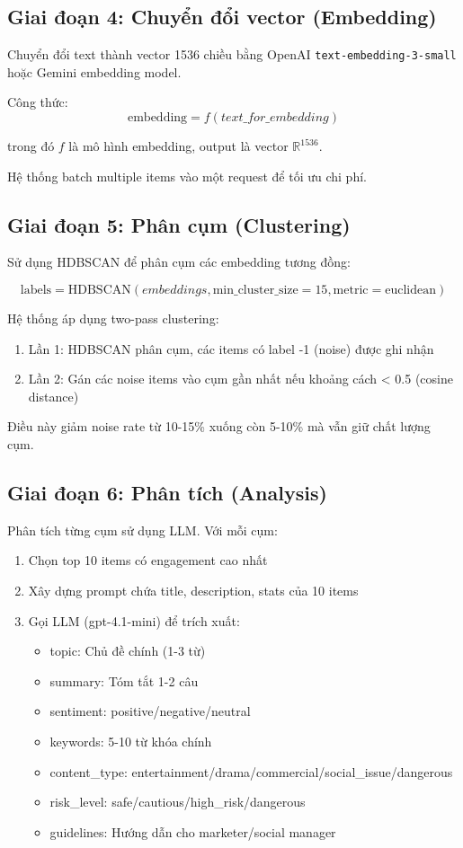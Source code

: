 \subsection{Giai đoạn 4: Chuyển đổi vector (Embedding)}

Chuyển đổi text thành vector 1536 chiều bằng OpenAI \texttt{text-embedding-3-small} hoặc Gemini embedding model.

Công thức:
\[
    \text{embedding} = f(text\_for\_embedding)
\]

trong đó \(f\) là mô hình embedding, output là vector \(\mathbb{R}^{1536}\).

Hệ thống batch multiple items vào một request để tối ưu chi phí.

\subsection{Giai đoạn 5: Phân cụm (Clustering)}

Sử dụng HDBSCAN để phân cụm các embedding tương đồng:

\[
    \text{labels} = \text{HDBSCAN}(embeddings, \text{min\_cluster\_size}=15, \text{metric}=\text{euclidean})
\]

Hệ thống áp dụng two-pass clustering:
\begin{enumerate}
    \item Lần 1: HDBSCAN phân cụm, các items có label -1 (noise) được ghi nhận
    \item Lần 2: Gán các noise items vào cụm gần nhất nếu khoảng cách < 0.5 (cosine distance)
\end{enumerate}

Điều này giảm noise rate từ 10-15\% xuống còn 5-10\% mà vẫn giữ chất lượng cụm.

\subsection{Giai đoạn 6: Phân tích (Analysis)}

Phân tích từng cụm sử dụng LLM. Với mỗi cụm:
\begin{enumerate}
    \item Chọn top 10 items có engagement cao nhất
    \item Xây dựng prompt chứa title, description, stats của 10 items
    \item Gọi LLM (gpt-4.1-mini) để trích xuất:
          \begin{itemize}
              \item topic: Chủ đề chính (1-3 từ)
              \item summary: Tóm tắt 1-2 câu
              \item sentiment: positive/negative/neutral
              \item keywords: 5-10 từ khóa chính
              \item content\_type: entertainment/drama/commercial/social\_issue/dangerous
              \item risk\_level: safe/cautious/high\_risk/dangerous
              \item guidelines: Hướng dẫn cho marketer/social manager
          \end{itemize}
\end{enumerate}

